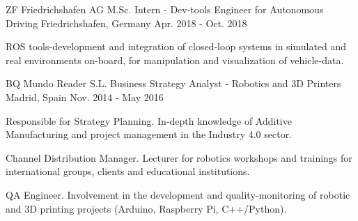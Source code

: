 \begin{cventries}
\cventry
    {ZF Friedrichshafen AG} %
    {M.Sc. Intern - Dev-tools Engineer for Autonomous Driving} %
    {Friedrichshafen, Germany} %
    {Apr. 2018 - Oct. 2018} %
    {
      \begin{cvitems} %
        \item {ROS tools-development and integration of closed-loop systems in simulated and real environments on-board, for manipulation and visualization of vehicle-data.}
      \end{cvitems}
    }

\cventry
    {BQ Mundo Reader S.L.} %
    {Business Strategy Analyst - Robotics and 3D Printers} %
    {Madrid, Spain} %
    {Nov. 2014 - May 2016} %
    {
      \begin{cvitems} %
        \item {Responsible for Strategy Planning. In-depth knowledge of Additive Manufacturing and project management in the Industry 4.0 sector.}
        \item {Channel Distribution Manager. Lecturer for robotics workshops and trainings for international groups, clients and educational institutions.}
        \item {QA Engineer. Involvement in the development and quality-monitoring of robotic and 3D printing projects (Arduino, Raspberry Pi, C++/Python).}
      \end{cvitems}
    }

\end{cventries}
